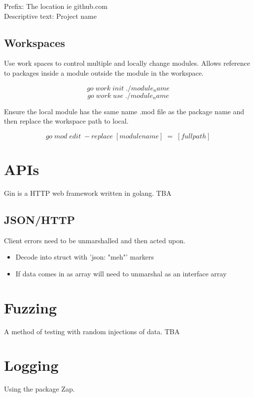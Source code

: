 \documentclass[11pt]{scrartcl} %
\begin{document}
Prefix: The location ie github.com \\
Descriptive text: Project name

\subsection{Workspaces}

Use work spaces to control multiple and locally change modules. Allows reference to packages inside a module
outside the module in the workspace.

\[ go\;work\;init\; ./module_name \]
\[ go\;work\;use\; ./module_name \]

Ensure the local module has the same name .mod file as the package name and then replace the 
workspace path to local.

\[ go\;mod\;edit\;-replace\;[module name]\;=\;[full path]\]

\section{APIs}

Gin is a HTTP web framework written in golang. TBA

\subsection{JSON/HTTP}

Client errors need to be unmarshalled and then acted upon.

\begin{itemize}
	\item Decode into struct with 'json: "meh"' markers
	\item If data comes in as array will need to unmarshal as an interface{} array
\end{itemize}

\section{Fuzzing}

A method of testing with random injections of data. TBA

\section{Logging}

Using the package Zap.
\end{document}
